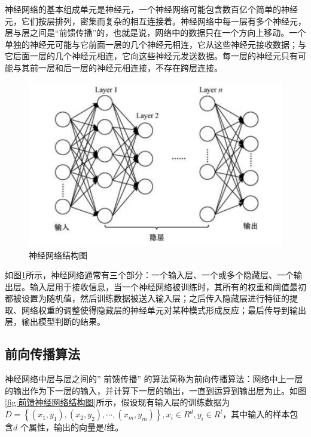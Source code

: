 神经网络的基本组成单元是神经元，一个神经网络可能包含数百亿个简单的神经元，它们按层排列，密集而复杂的相互连接着。神经网络中每一层有多个神经元，层与层之间是“前馈传播”的，也就是说，网络中的数据只在一个方向上移动。一个单独的神经元可能与它前面一层的几个神经元相连，它从这些神经元接收数据；与它后面一层的几个神经元相连，它向这些神经元发送数据。每一层的神经元只有可能与其前一层和后一层的神经元相连接，不存在跨层连接。

\begin{figure}[!hbt]
\centering
	\includegraphics[scale=0.5]{fig2/C2/深度神经网络结构图}%
	\caption{神经网络结构图}
	\label{fig:神经网络结构图}	
\end{figure}

如图\ref{fig:神经网络结构图}所示，神经网络通常有三个部分：一个输入层、一个或多个隐藏层、一个输出层。输入层用于接收信息，当一个神经网络被训练时，其所有的权重和阈值最初都被设置为随机值，然后训练数据被送入输入层；之后传入隐藏层进行特征的提取、网络权重的调整使得隐藏层的神经单元对某种模式形成反应；最后传导到输出层，输出模型判断的结果。

\subsection{前向传播算法}

神经网络中层与层之间的” 前馈传播” 的算法简称为前向传播算法：网络中上一层的输出作为下一层的输入，并计算下一层的输出，一直到运算到输出层为止。如图\ref{fig:前馈神经网络结构图}所示，假设现有输入层的训练数据为$D=\left\{\left(x_{1}, y_{1}\right),\left(x_{2}, y_{2}\right), \cdots,\left(x_{m}, y_{m}\right)\right\}, x_{i} \in R^{d}, y_{i} \in R^{l}$，其中输入的样本包含$d$ 个属性，输出的向量是$l$维。

